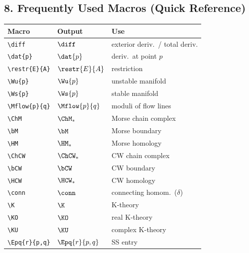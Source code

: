 \subsection*{8. Frequently Used Macros (Quick Reference)}

\begin{longtable}{@{} p{4cm} p{5cm} p{5cm} @{}}
	\toprule
	\textbf{Macro} & \textbf{Output} & \textbf{Use} \\
	\midrule
	\endhead
	
	\texttt{\textbackslash diff}        & $\diff$           & exterior deriv.\ / total deriv. \\
	\texttt{\textbackslash dat\{p\}}    & $\dat{p}$         & deriv.\ at point $p$ \\
	\texttt{\textbackslash restr\{E\}\{A\}} & $\restr{E}{A}$ & restriction \\
	\texttt{\textbackslash Wu\{p\}}     & $\Wu{p}$          & unstable manifold \\
	\texttt{\textbackslash Ws\{p\}}     & $\Ws{p}$          & stable manifold \\
	\texttt{\textbackslash Mflow\{p\}\{q\}} & $\Mflow{p}{q}$ & moduli of flow lines \\
	\texttt{\textbackslash ChM}         & $\ChM_*$          & Morse chain complex \\
	\texttt{\textbackslash bM}          & $\bM$             & Morse boundary \\
	\texttt{\textbackslash HM}          & $\HM_*$           & Morse homology \\
	\texttt{\textbackslash ChCW}        & $\ChCW_*$         & CW chain complex \\
	\texttt{\textbackslash bCW}         & $\bCW$            & CW boundary \\
	\texttt{\textbackslash HCW}         & $\HCW_*$          & CW homology \\
	\texttt{\textbackslash conn}        & $\conn$           & connecting homom.\ ($\delta$) \\
	\texttt{\textbackslash K}           & $\K$              & K-theory \\
	\texttt{\textbackslash KO}          & $\KO$             & real K-theory \\
	\texttt{\textbackslash KU}          & $\KU$             & complex K-theory \\
	\texttt{\textbackslash Epq\{r\}\{p,q\}} & $\Epq{r}{p,q}$ & SS entry \\

\end{longtable}

